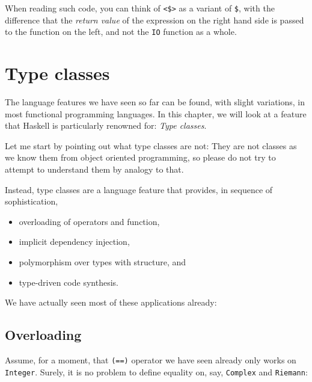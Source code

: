 \documentclass[11pt,
  american,
  DIV13]{article}
\providecommand{\tightlist}{%
  \setlength{\itemsep}{0pt}\setlength{\parskip}{0pt}}
\begin{document}
When reading such code, you can think of
\texttt{\textless{}\$\textgreater{}} as a variant of \texttt{\$}, with
the difference that the \emph{return value} of the expression on the
right hand side is passed to the function on the left, and not the
\texttt{IO} function as a whole.

\hypertarget{type-classes}{%
\section{Type classes}\label{type-classes}}

The language features we have seen so far can be found, with slight
variations, in most functional programming languages. In this chapter,
we will look at a feature that Haskell is particularly renowned for:
\emph{Type classes}.

Let me start by pointing out what type classes are not: They are not
classes as we know them from object oriented programming, so please do
not try to attempt to understand them by analogy to that.

Instead, type classes are a language feature that provides, in sequence
of sophistication,

\begin{itemize}
\tightlist
\item
  overloading of operators and function,
\item
  implicit dependency injection,
\item
  polymorphism over types with structure, and
\item
  type-driven code synthesis.
\end{itemize}

We have actually seen most of these applications already:

\hypertarget{overloading}{%
\subsection{Overloading}\label{overloading}}

Assume, for a moment, that \texttt{(==)} operator we have seen already
only works on \texttt{Integer}. Surely, it is no problem to define
equality on, say, \texttt{Complex} and \texttt{Riemann}:
\end{document}
